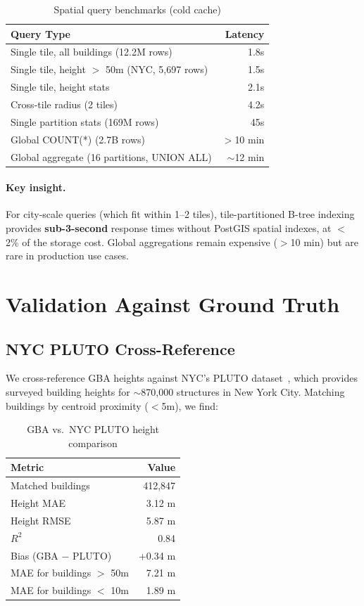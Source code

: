\documentclass[10pt,twocolumn]{article}
\begin{document}
\begin{table}[h]
\centering
\caption{Spatial query benchmarks (cold cache)}
\label{tab:queries}
\begin{tabular}{lr}
\toprule
\textbf{Query Type} & \textbf{Latency} \\
\midrule
Single tile, all buildings (12.2M rows) & 1.8s \\
Single tile, height $>$ 50m (NYC, 5,697 rows) & 1.5s \\
Single tile, height stats & 2.1s \\
Cross-tile radius (2 tiles) & 4.2s \\
Single partition stats (169M rows) & 45s \\
Global COUNT(*) (2.7B rows) & $>$10 min \\
Global aggregate (16 partitions, UNION ALL) & $\sim$12 min \\
\bottomrule
\end{tabular}
\end{table}

\paragraph{Key insight.} For city-scale queries (which fit within 1--2 tiles), tile-partitioned B-tree indexing provides \textbf{sub-3-second} response times without PostGIS spatial indexes, at $<$2\% of the storage cost. Global aggregations remain expensive ($>$10 min) but are rare in production use cases.

\section{Validation Against Ground Truth}
\label{sec:validation}

\subsection{NYC PLUTO Cross-Reference}

We cross-reference GBA heights against NYC's PLUTO dataset~\citep{nyc2023pluto}, which provides surveyed building heights for $\sim$870,000 structures in New York City. Matching buildings by centroid proximity ($<$5m), we find:

\begin{table}[h]
\centering
\caption{GBA vs.\ NYC PLUTO height comparison}
\label{tab:pluto}
\begin{tabular}{lr}
\toprule
\textbf{Metric} & \textbf{Value} \\
\midrule
Matched buildings & 412,847 \\
Height MAE & 3.12 m \\
Height RMSE & 5.87 m \\
$R^2$ & 0.84 \\
Bias (GBA $-$ PLUTO) & +0.34 m \\
MAE for buildings $>$ 50m & 7.21 m \\
MAE for buildings $<$ 10m & 1.89 m \\
\bottomrule
\end{tabular}
\end{table}
\end{document}
